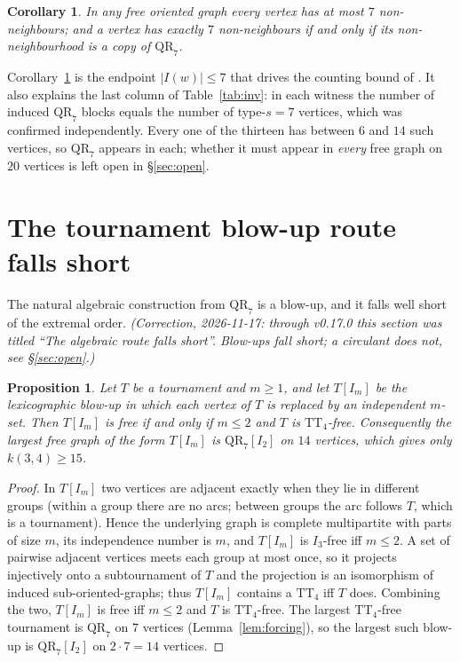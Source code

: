 \documentclass[11pt]{amsart}
\newcommand{\TT}[1]{\mathrm{TT}_{#1}}
\newcommand{\I}[1]{I_{#1}}
\newcommand{\QR}{\mathrm{QR}_7}
\theoremstyle{plain}
\newtheorem{proposition}[theorem]{Proposition}
\newtheorem{corollary}[theorem]{Corollary}
\theoremstyle{definition}
\theoremstyle{remark}
\begin{document}
\begin{corollary}\label{cor:s7}
In any free oriented graph every vertex has at most $7$ non-neighbours;
and a vertex has exactly $7$ non-neighbours if and only if its
non-neighbourhood is a copy of $\QR$.
\end{corollary}

Corollary~\ref{cor:s7} is the endpoint $|I(w)|\le 7$ that drives the
counting bound of \cite[\S3]{PartG}. It also explains the last column of
Table~\ref{tab:inv}: in each witness the number of induced $\QR$ blocks
equals the number of type-$s{=}7$ vertices, which was confirmed
independently. Every one of the thirteen has between $6$ and $14$ such
vertices, so $\QR$ appears in each; whether it must appear in \emph{every}
free graph on $20$ vertices is left open in \S\ref{sec:open}.

\section{The tournament blow-up route falls short}\label{sec:blowup}

The natural algebraic construction from $\QR$ is a blow-up, and it falls
well short of the extremal order. \emph{(Correction, 2026-11-17: through
v0.17.0 this section was titled ``The algebraic route falls short''.
Blow-ups fall short; a circulant does not, see \S\ref{sec:open}.)}

\begin{proposition}\label{prop:blowup}
Let $T$ be a tournament and $m\ge 1$, and let $T[\I{m}]$ be the
lexicographic blow-up in which each vertex of $T$ is replaced by an
independent $m$-set. Then $T[\I{m}]$ is free if and only if $m\le 2$ and
$T$ is $\TT{4}$-free. Consequently the largest free graph of the form
$T[\I{m}]$ is $\QR[\I{2}]$ on $14$ vertices, which gives only
$k(3,4)\ge 15$.
\end{proposition}

\begin{proof}
In $T[\I{m}]$ two vertices are adjacent exactly when they lie in
different groups (within a group there are no arcs; between groups the
arc follows $T$, which is a tournament). Hence the underlying graph is
complete multipartite with parts of size $m$, its independence number is
$m$, and $T[\I{m}]$ is $\I{3}$-free iff $m\le 2$. A set of pairwise
adjacent vertices meets each group at most once, so it projects
injectively onto a subtournament of $T$ and the projection is an
isomorphism of induced sub-oriented-graphs; thus $T[\I{m}]$ contains a
$\TT{4}$ iff $T$ does. Combining the two, $T[\I{m}]$ is free iff $m\le 2$
and $T$ is $\TT{4}$-free. The largest $\TT{4}$-free tournament is $\QR$ on
$7$ vertices (Lemma~\ref{lem:forcing}), so the largest such blow-up is
$\QR[\I{2}]$ on $2\cdot 7=14$ vertices.
\end{proof}
\end{document}
